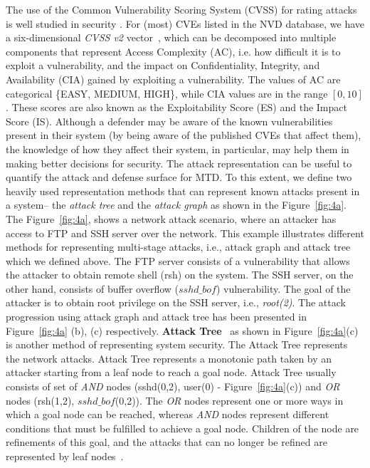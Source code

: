 The use of the Common Vulnerability Scoring System (CVSS) for rating attacks is well studied in security . For (most) CVEs listed in the NVD database, we have a six-dimensional \emph{CVSS v2} vector~, which can be decomposed into multiple components that represent Access Complexity (AC), i.e. how difficult it is to exploit a vulnerability, and the impact on Confidentiality, Integrity, and Availability (CIA) gained by exploiting a vulnerability. The values of AC are categorical \{EASY, MEDIUM, HIGH\}, while CIA values are in the range $[0, 10]$. These scores are also known as the Exploitability Score (ES) and the Impact Score (IS).
Although a defender may be aware of the known vulnerabilities present in their system (by being aware of the published CVEs that affect them), the knowledge of how they affect their system, in particular, may help them in making better decisions for security. The attack representation can be useful to quantify the attack and defense surface for MTD. To this extent, we define two heavily used representation methods that can represent known attacks present in a system-- the \emph{attack tree} and the \emph{attack graph} as shown in the Figure~\ref{fig:4a}. 
The Figure~\ref{fig:4a}, shows a network attack scenario, where an attacker has access to FTP and SSH server over the network. This example illustrates different methods for representing multi-stage attacks, i.e., attack graph and attack tree which we defined above. The FTP server consists of a vulnerability that allows the attacker to obtain remote shell (rsh) on the system. The SSH server, on the other hand, consists of buffer overflow ($sshd\_bof$) vulnerability. The goal of the attacker is to obtain root privilege on the SSH server, i.e., \textit{root(2)}. The attack progression using attack graph and attack tree has been presented in Figure~\ref{fig:4a} (b), (c) respectively.
\textbf{Attack Tree}~ as shown in Figure~\ref{fig:4a}(c) is another method of representing system security. The Attack Tree represents the network attacks. Attack Tree represents a monotonic path taken by an attacker starting from a leaf node to reach a goal node. Attack Tree usually consists of set of \emph{AND} nodes (sshd(0,2), user(0) - Figure~\ref{fig:4a}(c)) and \emph{OR} nodes (rsh(1,2), $sshd\_bof$(0,2)). The \emph{OR} nodes represent one or more ways in which a goal node can be reached, whereas \emph{AND} nodes represent different conditions that must be fulfilled to achieve a goal node. Children of the node are refinements of this goal, and the attacks that can no longer be refined are represented by leaf nodes~.
